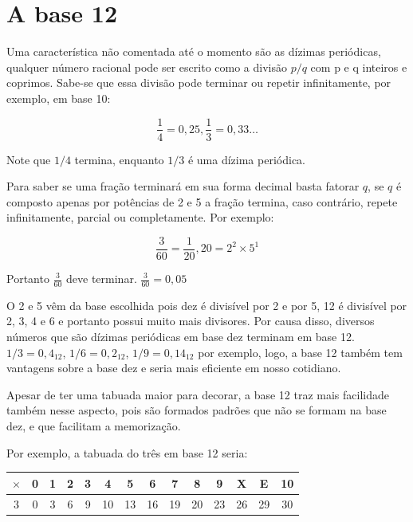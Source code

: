 \documentclass{report}
\theoremstyle{definition}
\begin{document}
\section{A base 12}

Uma característica não comentada até o momento são as dízimas periódicas, qualquer número racional pode ser escrito como a divisão $p/q$ com p e q inteiros e coprimos. Sabe-se que essa divisão pode terminar ou repetir infinitamente, por exemplo, em base 10:

\begin{equation*}
\frac{1}{4} = 0,25, \frac{1}{3} = 0,33\ldots
\end{equation*}

Note que $1/4$ termina, enquanto $1/3$ é uma dízima periódica.

Para saber se uma fração terminará em sua forma decimal basta fatorar $q$, se $q$ é composto apenas por potências de 2 e 5 a fração termina, caso contrário, repete infinitamente, parcial ou completamente. Por exemplo:

\begin{equation*}
\frac{3}{60} = \frac{1}{20}, 20 = 2^2 \times 5^1
\end{equation*}

Portanto $\frac{3}{60}$ deve terminar. $\frac{3}{60}=0,05$

O 2 e 5 vêm da base escolhida pois dez é divisível por 2 e por 5, 12 é divisível por 2, 3, 4 e 6 e portanto possui muito mais divisores. Por causa disso, diversos números que são dízimas periódicas em base dez terminam em base 12. $1/3 = 0,4_{12}$, $1/6 = 0,2_{12}$, $1/9 = 0,14_{12}$ por exemplo, logo, a base 12 também tem vantagens sobre a base dez e seria mais eficiente em nosso cotidiano.

Apesar de ter uma tabuada maior para decorar, a base 12 traz mais facilidade também nesse aspecto, pois são formados padrões que não se formam na base dez, e que facilitam a memorização.

Por exemplo, a tabuada do três em base 12 seria:

\begin{center}
    \begin{tabular}{ c|c|c|c|c|c|c|c|c|c|c|c|c|c } 
        $\times$ & 0 & 1 & 2 & 3 & 4 & 5 & 6 & 7 & 8 & 9 & X & E & 10\\ 
        \hline
        3 & 0 & 3 & 6 & 9 & 10 & 13 & 16 & 19 & 20 & 23 & 26 & 29 & 30\\ 
    \end{tabular}
\end{center}
\end{document}
